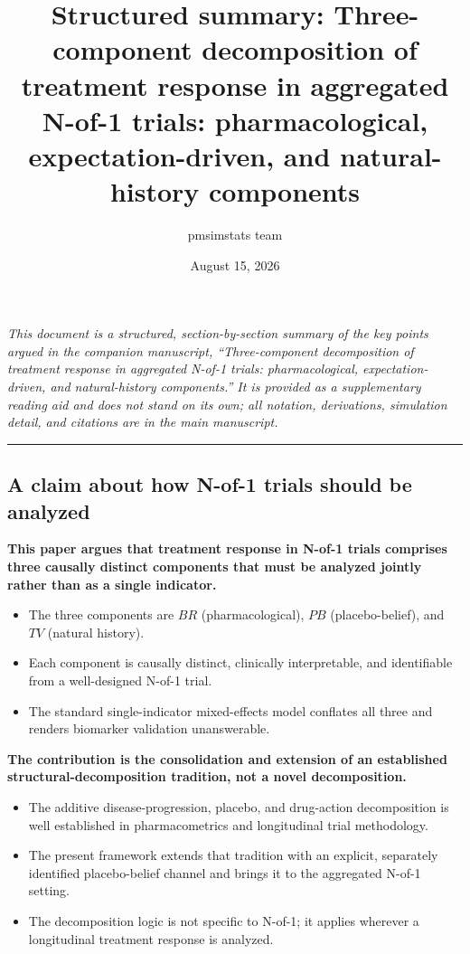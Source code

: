 \documentclass[
  11pt,
]{article}
\title{Structured summary: Three-component decomposition of treatment response in aggregated N-of-1 trials: pharmacological, expectation-driven, and natural-history components}
\author{pmsimstats team}
\date{August 15, 2026}
\begin{document}
\maketitle

{
\setcounter{tocdepth}{2}
\tableofcontents
}
\emph{This document is a structured, section-by-section summary of the key points argued in the companion manuscript, ``Three-component decomposition of treatment response in aggregated N-of-1 trials: pharmacological, expectation-driven, and natural-history components.'' It is provided as a supplementary reading aid and does not stand on its own; all notation, derivations, simulation detail, and citations are in the main manuscript.}

\bigskip\noindent

\rule{\textwidth}{0.4pt}\bigskip

\subsection{A claim about how N-of-1 trials should be analyzed}\label{a-claim-about-how-n-of-1-trials-should-be-analyzed}

\textbf{This paper argues that treatment response in N-of-1 trials comprises three causally distinct components that must be analyzed jointly rather than as a single indicator.}

\begin{itemize}\setlength{\itemsep}{2pt}\setlength{\parskip}{0pt}
\item The three components are $BR$ (pharmacological), $PB$ (placebo-belief), and $TV$ (natural history).
\item Each component is causally distinct, clinically interpretable, and identifiable from a well-designed N-of-1 trial.
\item The standard single-indicator mixed-effects model conflates all three and renders biomarker validation unanswerable.
\end{itemize}

\textbf{The contribution is the consolidation and extension of an established structural-decomposition tradition, not a novel decomposition.}

\begin{itemize}\setlength{\itemsep}{2pt}\setlength{\parskip}{0pt}
\item The additive disease-progression, placebo, and drug-action decomposition is well established in pharmacometrics and longitudinal trial methodology.
\item The present framework extends that tradition with an explicit, separately identified placebo-belief channel and brings it to the aggregated N-of-1 setting.
\item The decomposition logic is not specific to N-of-1; it applies wherever a longitudinal treatment response is analyzed.
\end{itemize}
\end{document}
